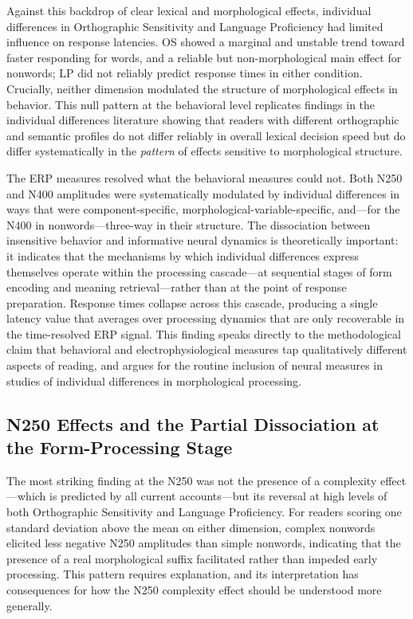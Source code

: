 	Against this backdrop of clear lexical and morphological effects, individual differences in Orthographic Sensitivity and Language Proficiency had limited influence on response latencies. OS showed a marginal and unstable trend toward faster responding for words, and a reliable but non-morphological main effect for nonwords; LP did not reliably predict response times in either condition. Crucially, neither dimension modulated the structure of morphological effects in behavior. This null pattern at the behavioral level replicates findings in the individual differences literature \citep{CITATION} showing that readers with different orthographic and semantic profiles do not differ reliably in overall lexical decision speed but do differ systematically in the \emph{pattern} of effects sensitive to morphological structure.
	
	The ERP measures resolved what the behavioral measures could not. Both N250 and N400 amplitudes were systematically modulated by individual differences in ways that were component-specific, morphological-variable-specific, and—for the N400 in nonwords—three-way in their structure. The dissociation between insensitive behavior and informative neural dynamics is theoretically important: it indicates that the mechanisms by which individual differences express themselves operate within the processing cascade—at sequential stages of form encoding and meaning retrieval—rather than at the point of response preparation. Response times collapse across this cascade, producing a single latency value that averages over processing dynamics that are only recoverable in the time-resolved ERP signal. This finding speaks directly to the methodological claim that behavioral and electrophysiological measures tap qualitatively different aspects of reading, and argues for the routine inclusion of neural measures in studies of individual differences in morphological processing.
	
	\subsection{N250 Effects and the Partial Dissociation at the Form-Processing Stage}
	
	The most striking finding at the N250 was not the presence of a complexity effect—which is predicted by all current accounts—but its reversal at high levels of both Orthographic Sensitivity and Language Proficiency. For readers scoring one standard deviation above the mean on either dimension, complex nonwords elicited less negative N250 amplitudes than simple nonwords, indicating that the presence of a real morphological suffix facilitated rather than impeded early processing. This pattern requires explanation, and its interpretation has consequences for how the N250 complexity effect should be understood more generally.
	
